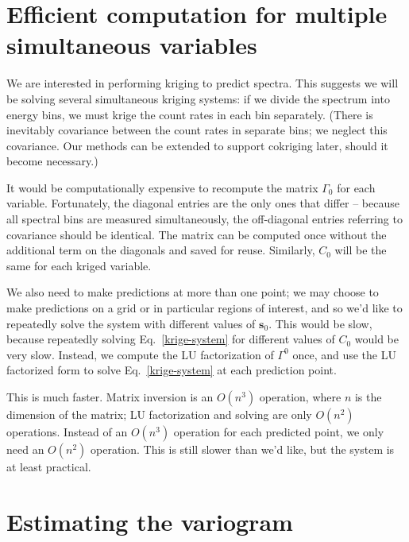 \section{Efficient computation for multiple simultaneous variables}

We are interested in performing kriging to predict spectra. This suggests we
will be solving several simultaneous kriging systems: if we divide the spectrum
into energy bins, we must krige the count rates in each bin separately. (There
is inevitably covariance between the count rates in separate bins; we neglect
this covariance. Our methods can be extended to support cokriging later, should
it become necessary.)

It would be computationally expensive to recompute the matrix \(\Gamma_0\) for
each variable. Fortunately, the diagonal entries are the only ones that differ
-- because all spectral bins are measured simultaneously, the off-diagonal
entries referring to covariance should be identical. The matrix can be computed
once without the additional term on the diagonals and saved for
reuse. Similarly, \(C_0\) will be the same for each kriged variable.

We also need to make predictions at more than one point; we may choose to make
predictions on a grid or in particular regions of interest, and so we'd like to
repeatedly solve the system with different values of \(\mathbf{s}_0\). This
would be slow, because repeatedly solving Eq.~\ref{krige-system} for different
values of \(C_0\) would be very slow. Instead, we compute the LU factorization
of \(\Gamma^0\) once, and use the LU factorized form to solve
Eq.~\ref{krige-system} at each prediction point.

This is much faster. Matrix inversion is an \(O(n^3)\) operation, where \(n\) is
the dimension of the matrix; LU factorization and solving are only \(O(n^2)\)
operations. Instead of an \(O(n^3)\) operation for each predicted point, we only
need an \(O(n^2)\) operation. This is still slower than we'd like, but the
system is at least practical.

\section{Estimating the variogram}


